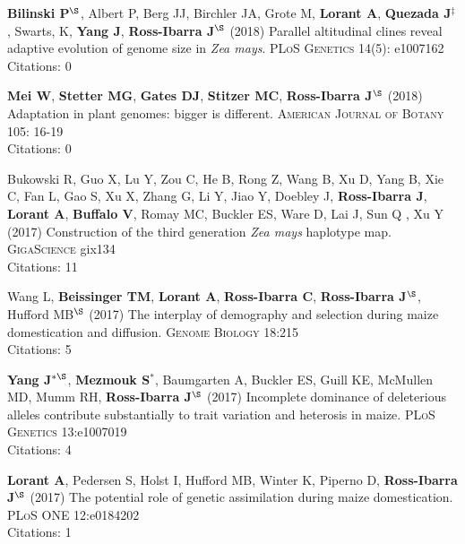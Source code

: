 \documentclass[letterpaper,10pt]{article}
\begin{document}
\begin{etaremune}
\item \textbf{Bilinski P}$^\S$, Albert P, Berg JJ, Birchler JA, Grote M, \textbf{Lorant A}, \textbf{Quezada J}$^\ddagger$, Swarts, K, \textbf{Yang J}, \textbf{Ross-Ibarra J}$^\S$ (2018) Parallel altitudinal clines reveal adaptive evolution of genome size in \textit{Zea mays}. \textsc{PLoS Genetics} 14(5): e1007162
\\Citations: 0\\

\item {\bf Mei W}, {\bf Stetter MG}, {\bf Gates DJ}, {\bf Stitzer MC}, {\bf Ross-Ibarra J}$^\S$ (2018) Adaptation in plant genomes: bigger is different.  \textsc{American Journal of Botany} 105: 16-19
\\Citations: 0\\

\item Bukowski R, Guo X, Lu Y, Zou C, He B, Rong Z, Wang B,  Xu D,  Yang B, Xie C,  Fan L, Gao S, Xu X, Zhang G, Li Y, Jiao Y, Doebley J, {\bf Ross-Ibarra J}, {\bf Lorant A}, {\bf Buffalo V}, Romay MC, Buckler ES, Ware D, Lai J, Sun Q , Xu Y (2017) Construction of the third generation \emph{Zea mays} haplotype map. \textsc{GigaScience} gix134
\\Citations: 11\\

\item Wang L, \textbf{Beissinger TM}, \textbf{Lorant A}, \textbf{Ross-Ibarra C}, \textbf{Ross-Ibarra J}$^\S$, Hufford MB$^\S$ (2017) The interplay of demography and selection during maize domestication and diffusion. \textsc{Genome Biology} 18:215
\\Citations: 5\\

\item {\bf Yang J}$^{*\S}$, {\bf Mezmouk S}$^*$, Baumgarten A, Buckler ES, Guill KE, McMullen MD, Mumm RH, {\bf Ross-Ibarra J}$^\S$ (2017) Incomplete dominance of deleterious alleles contribute substantially to trait variation and heterosis in maize. \textsc{PLoS Genetics} 13:e1007019
\\Citations: 4\\

\item \textbf{Lorant A}, Pedersen S, Holst I, Hufford MB, Winter K, Piperno D, \textbf{Ross-Ibarra J}$^\S$ (2017) The potential role of genetic assimilation during maize domestication. \textsc{PLoS ONE} 12:e0184202
\\Citations: 1\\


\end{etaremune}
\end{document}
